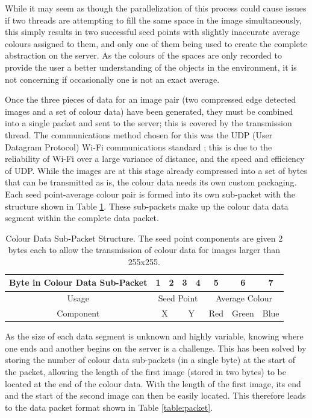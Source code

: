 While it may seem as though the parallelization of this process could cause issues if two threads are attempting to fill the same space in the image simultaneously, this simply results in two successful seed points with slightly inaccurate average colours assigned to them, and only one of them being used to create the complete abstraction on the server. As the colours of the spaces are only recorded to provide the user a better understanding of the objects in the environment, it is not concerning if occasionally one is not an exact average.

Once the three pieces of data for an image pair (two compressed edge detected images and a set of colour data) have been generated, they must be combined into a single packet and sent to the server; this is covered by the transmission thread. The communications method chosen for this was the UDP (User Datagram Protocol) Wi-Fi communications standard \cite{postel1980user}; this is due to the reliability of Wi-Fi over a large variance of distance, and the speed and efficiency of UDP. While the images are at this stage already compressed into a set of bytes that can be transmitted as is, the colour data needs its own custom packaging. Each seed point-average colour pair is formed into its own sub-packet with the structure shown in Table \ref{table:colour}. These sub-packets make up the colour data data segment within the complete data packet.

\begin{table}[H]
\centering
\caption{Colour Data Sub-Packet Structure. The seed point components are given 2 bytes each to allow the transmission of colour data for images larger than 255x255.}
\label{table:colour}
\begin{tabular}{|c|c|c|c|c|c|c|c|}
\hline
Byte in Colour Data Sub-Packet & 1          & 2         & 3          & 4         & 5         & 6           & 7         \\ \hline
Usage                          & \multicolumn{4}{c|}{Seed Point}                 & \multicolumn{3}{c|}{Average Colour} \\ \hline
Component                      & \multicolumn{2}{c|}{X} & \multicolumn{2}{c|}{Y} & Red       & Green       & Blue      \\ \hline
\end{tabular}
\end{table}

As the size of each data segment is unknown and highly variable, knowing where one ends and another begins on the server is a challenge. This has been solved by storing the number of colour data sub-packets (in a single byte) at the start of the packet, allowing the length of the first image (stored in two bytes) to be located at the end of the colour data. With the length of the first image, its end and the start of the second image can then be easily located. This therefore leads to the data packet format shown in Table \ref{table:packet}.

